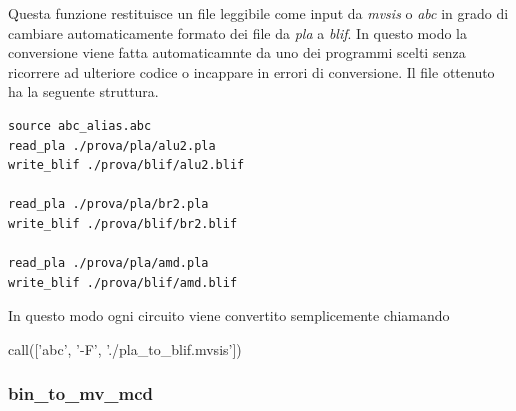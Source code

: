 \documentclass[italian,]{book}
\newenvironment{Shaded}{\begin{snugshade}}{\end{snugshade}}
\newcommand{\NormalTok}[1]{#1}
\newcommand{\StringTok}[1]{\textcolor[rgb]{0.31,0.60,0.02}{#1}}
\begin{document}
Questa funzione restituisce un file leggibile come input da \emph{mvsis} o \emph{abc} in grado di cambiare automaticamente formato dei file da \emph{pla} a \emph{blif}. In questo modo la conversione viene fatta automaticamnte da uno dei programmi scelti senza ricorrere ad ulteriore codice o incappare in errori di conversione. Il file ottenuto ha la seguente struttura.

\begin{verbatim}
source abc_alias.abc
read_pla ./prova/pla/alu2.pla
write_blif ./prova/blif/alu2.blif

read_pla ./prova/pla/br2.pla
write_blif ./prova/blif/br2.blif

read_pla ./prova/pla/amd.pla
write_blif ./prova/blif/amd.blif
\end{verbatim}

In questo modo ogni circuito viene convertito semplicemente chiamando

\begin{Shaded}
\begin{Highlighting}[]
\NormalTok{call([}\StringTok{'abc'}\NormalTok{, }\StringTok{'-F'}\NormalTok{, }\StringTok{'./pla_to_blif.mvsis'}\NormalTok{])}
\end{Highlighting}
\end{Shaded}

\newpage

\hypertarget{bin_to_mv_mcd}{%
\subsubsection{bin\_to\_mv\_mcd}\label{bin_to_mv_mcd}}
\end{document}
